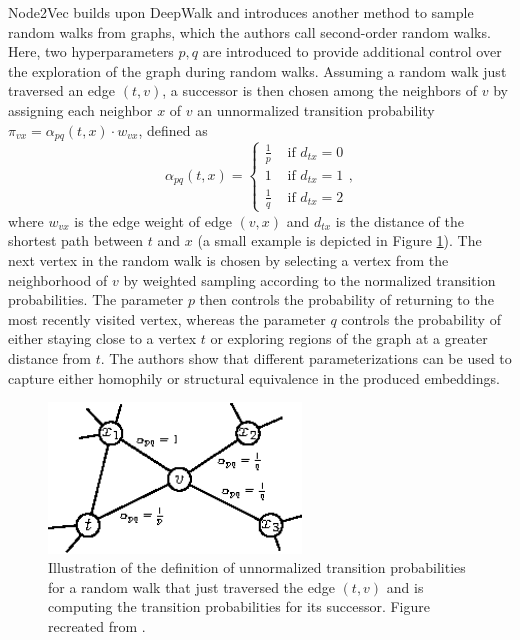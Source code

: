 \documentclass[draft,final]{vutinfth} %
\begin{document}
Node2Vec \cite{GroverL16} builds upon DeepWalk and introduces another method to sample random walks from graphs, which the authors call second-order random walks. Here, two hyperparameters $p, q$ are introduced to provide additional control over the exploration of the graph during random walks. 
Assuming a random walk just traversed an edge $(t, v)$, a successor is then chosen among the neighbors of $v$ by assigning each neighbor $x$ of $v$ an unnormalized transition probability $\pi_{vx} = \alpha_{pq}(t,x) \cdot w_{vx}$, defined as  
\[
    \alpha_{pq}(t,x) = \begin{cases}
        \frac{1}{p} & \text{ if } d_{tx} = 0 \\
        1 & \text{ if } d_{tx} = 1 \\
        \frac{1}{q} & \text{ if } d_{tx} = 2 
    \end{cases},    
\] 
where $w_{vx}$ is the edge weight of edge $(v,x)$ and $d_{tx}$ is the distance of the shortest path between $t$ and $x$ (a small example is depicted in Figure \ref{fig:node2vec}). The next vertex in the random walk is chosen by selecting a vertex from the neighborhood of $v$ by weighted sampling according to the normalized transition probabilities. 
The parameter $p$ then controls the probability of returning to the most recently visited vertex, whereas the parameter $q$ controls the probability of either staying close to a vertex $t$ or exploring regions of the graph at a greater distance from $t$. The authors show that different parameterizations can be used to capture either homophily or structural equivalence in the produced embeddings. 

\begin{figure}
    \centering
    \includegraphics[width=0.6\textwidth]{graphics/node2vec.eps}
    \caption{Illustration of the definition of unnormalized transition probabilities for a random walk that just traversed the edge $(t,v)$ and is computing the transition probabilities for its successor. Figure recreated from \cite{GroverL16}.}
    \label{fig:node2vec}
\end{figure}
\end{document}
